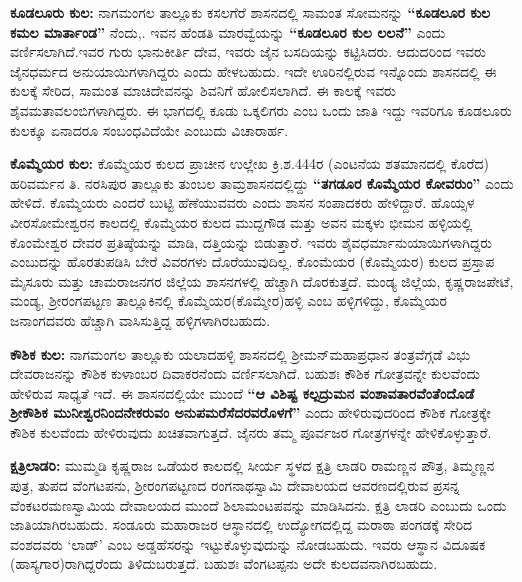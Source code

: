 \textbf{ಕೂಡಲೂರು ಕುಲ:} ನಾಗಮಂಗಲ ತಾಲ್ಲೂಕು ಕಸಲಗೆರೆ ಶಾಸನದಲ್ಲಿ ಸಾಮಂತ ಸೋಮನನ್ನು \textbf{“ಕೂಡಲೂರ ಕುಲ ಕಮಲ ಮಾರ್ತಾಂಡ”} ನೆಂದು,. ಇವನ ಹೆಂಡತಿ ಮಾರವ್ವೆಯನ್ನು \textbf{“ಕೂಡಲೂರ ಕುಲ ಲಲನೆ”} ಎಂದು ವರ್ಣಿಸಲಾಗಿದೆ.\break ಇವರ ಗುರು ಭಾನುಕೀರ್ತಿ ದೇವ, ಇವರು ಜೈನ ಬಸದಿಯನ್ನು ಕಟ್ಟಿಸಿದರು. ಆದುದರಿಂದ ಇವರು ಜೈನಧರ್ಮದ ಅನುಯಾಯಿಗಳಾಗಿದ್ದರು ಎಂದು ಹೇಳಬಹುದು. ಇದೇ ಊರಿನಲ್ಲಿರುವ ಇನ್ನೊಂದು ಶಾಸನದಲ್ಲಿ ಈ ಕುಲಕ್ಕೆ ಸೇರಿದ, ಸಾಮಂತ ಮಾಚಿದೇವನನ್ನು ಶಿವನಿಗೆ ಹೋಲಿಸಲಾಗಿದೆ. ಈ ಕಾಲಕ್ಕೆ ಇವರು ಶೈವಮತಾವಲಂಬಿಗಳಾಗಿದ್ದರು. ಈ ಭಾಗದಲ್ಲಿ ಕೂಡು ಒಕ್ಕಲಿಗರು ಎಂಬ ಒಂದು ಜಾತಿ ಇದ್ದು ಇವರಿಗೂ ಕೂಡಲೂರು ಕುಲಕ್ಕೂ ಏನಾದರೂ ಸಂಬಂಧವಿದೆಯೇ ಎಂಬುದು ವಿಚಾರಾರ್ಹ.

\textbf{ಕೊಮ್ಮೆಯರ ಕುಲ:} ಕೊಮ್ಮೆಯರ ಕುಲದ ಪ್ರಾಚೀನ ಉಲ್ಲೇಖ ಕ್ರಿ.ಶ.444ರ (ಎಂಟನೆಯ ಶತಮಾನದಲ್ಲಿ ಕೊರೆದ) ಹರಿವರ್ಮನ ತಿ. ನರಸಿಪುರ ತಾಲ್ಲೂಕು ತುಂಬಲ ತಾಮ್ರಶಾಸನದಲ್ಲಿದ್ದು \textbf{“ತಗಡೂರ ಕೊಮ್ಮೆಯರ ಕೋವರುಂ”} ಎಂದು ಹೇಳಿದೆ. ಕೊಮ್ಮೆಯರು ಎಂದರೆ ಬುಟ್ಟಿ ಹೆಣೆಯುವವರು ಎಂದು ಶಾಸನ ಸಂಪಾದಕರು ಹೇಳಿದ್ದಾರೆ. ಹೊಯ್ಸಳ ವೀರಸೋಮೇಶ್ವರನ ಕಾಲದಲ್ಲಿ ಕೊಮ್ಮೆಯರ ಕುಲದ ಮುದ್ದಗೌಡ ಮತ್ತು ಅವನ ಮಕ್ಕಳು ಭೀಮನ ಹಳ್ಳಿಯಲ್ಲಿ ಕೊಂಮೇಶ್ವರ ದೇವರ ಪ್ರತಿಷ್ಠೆಯನ್ನು ಮಾಡಿ, ದತ್ತಿಯನ್ನು ಬಿಡುತ್ತಾರೆ. ಇವರು ಶೈವಧರ್ಮಾನುಯಾಯಿಗಳಾಗಿದ್ದರು ಎಂಬುದನ್ನು ಹೊರತುಪಡಿಸಿ ಬೇರೆ ವಿವರಗಳು ದೊರೆಯುವುದಿಲ್ಲ. ಕೊಂಮೆಯರ (ಕೊಮ್ಮೆಯರ) ಕುಲದ ಪ್ರಸ್ತಾಪ ಮೈಸೂರು ಮತ್ತು ಚಾಮರಾಜನಗರ ಜಿಲ್ಲೆಯ ಶಾಸನಗಳಲ್ಲಿ ಹೆಚ್ಚಾಗಿ ದೊರಕುತ್ತದೆ. ಮಂಡ್ಯ ಜಿಲ್ಲೆಯ, ಕೃಷ್ಣರಾಜಪೇಟೆ, ಮಂಡ್ಯ, ಶ‍್ರೀರಂಗಪಟ್ಟಣ ತಾಲ್ಲೂಕಿನಲ್ಲಿ ಕೊಮ್ಮೆಯರ(ಕೊಮ್ಮೇರ)ಹಳ್ಳಿ ಎಂಬ ಹಳ್ಳಿಗಳಿದ್ದು, ಕೊಮ್ಮೆಯರ ಜನಾಂಗದವರು ಹೆಚ್ಚಾಗಿ ವಾಸಿಸುತ್ತಿದ್ದ ಹಳ್ಳಿಗಳಾಗಿರಬಹುದು.

\textbf{ಕೌಶಿಕ ಕುಲ:} ನಾಗಮಂಗಲ ತಾಲ್ಲೂಕು ಯಲಾದಹಳ್ಳಿ ಶಾಸನದಲ್ಲಿ ಶ‍್ರೀಮನ್​ಮಹಾಪ್ರಧಾನ ತಂತ್ರವೆಗ್ಗಡೆ ವಿಭು ದೇವರಾಜನನ್ನು ಕೌಶಿಕ ಕುಳಾಂಬರ ದಿವಾಕರನೆಂದು ವರ್ಣಿಸಲಾಗಿದೆ. ಬಹುಶಃ ಕೌಶಿಕ ಗೋತ್ರವನ್ನೇ ಕುಲವೆಂದು ಹೇಳಿರುವ ಸಾಧ್ಯತೆ ಇದೆ. ಈ ಶಾಸನದಲ್ಲಿಯೇ ಮುಂದೆ \textbf{“ಆ ವಿಶಿಷ್ಟ ಕಲ್ಪದ್ರುಮನ ವಂಶಾವತಾರವೆಂತೆಂದೊಡೆ ಶ‍್ರೀಕೌಶಿಕ ಮುನೀಶ್ವರನಿಂದನೇಕರುವಂ ಅನುಪಮರೆಸೆದರವರೊಳಗೆ”} ಎಂದು ಹೇಳಿರುವುದರಿಂದ ಕೌಶಿಕ ಗೋತ್ರಕ್ಕೇ ಕೌಶಿಕ ಕುಲವೆಂದು ಹೇಳಿರುವುದು ಖಚಿತವಾಗುತ್ತದೆ. ಜೈನರು ತಮ್ಮ ಪೂರ್ವಜರ ಗೋತ್ರಗಳನ್ನೇ ಹೇಳಿಕೊಳ್ಳುತ್ತಾರೆ.

\textbf{ಕ್ಷತ್ರಿಲಾಡರಿ:} ಮುಮ್ಮಡಿ ಕೃಷ್ಣರಾಜ ಒಡೆಯರ ಕಾಲದಲ್ಲಿ ಸೀರ್ಯ ಸ್ಥಳದ ಕ್ಷತ್ರಿ ಲಾಡರಿ ರಾಮಣ್ಣನ ಪೌತ್ರ, ತಿಮ್ಮಣ್ಣನ ಪುತ್ರ, ತುಪದ ವೆಂಗಟಪನು, ಶ‍್ರೀರಂಗಪಟ್ಟಣದ ರಂಗನಾಥಸ್ವಾಮಿ ದೇವಾಲಯದ ಆವರಣದಲ್ಲಿರುವ ಪ್ರಸನ್ನ ವೆಂಕಟರಮಣಸ್ವಾಮಿಯ ದೇವಾಲಯದ ಮುಂದೆ ಶಿಲಾಮಂಟಪವನ್ನು ಮಾಡಿಸಿದನು. ಕ್ಷತ್ರಿ ಲಾಡರಿ ಎಂಬುದು ಒಂದು ಜಾತಿಯಾಗಿರಬಹುದು. ಸಂಡೂರು ಮಹಾರಾಜರ ಆಸ್ಥಾನದಲ್ಲಿ ಉದ್ಯೋಗದಲ್ಲಿದ್ದ ಮರಾಠಾ ಪಂಗಡಕ್ಕೆ ಸೇರಿದ ವಂಶದವರು ‘ಲಾಡ್​’ ಎಂಬ ಅಡ್ಡಹೆಸರನ್ನು ಇಟ್ಟುಕೊಳ್ಳುವುದುನ್ನು ನೋಡಬಹುದು. ಇವರು ಆಸ್ಥಾನ ವಿದೂಷಕ (ಹಾಸ್ಯಗಾರ)ರಾಗಿದ್ದರೆಂದು ತಿಳಿದುಬರುತ್ತದೆ. ಬಹುಶಃ ವೆಂಗಟಪ್ಪನು ಅದೇ ಕುಲದವನಾಗಿರಬಹುದು.

